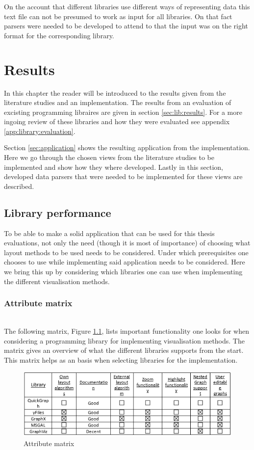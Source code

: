 \documentclass[a4paper,11pt]{kth-mag}
\begin{document}
On the account that different libraries use different ways of representing data this text file can not be presumed to work as input for all libraries. On that fact parsers were needed to be developed to
attend to that the input was on the right format for the corresponding library.
\chapter{Results}
\label{chap:results}
In this chapter the reader will be introduced to the results given from the literature studies and an implementation. The results from an evaluation of excisting programming
 libraires are given in section \ref{sec:lib:results}. For a more ingoing review of these libraries and how they were evaluated see appendix \ref{app:library:evaluation}.

Section \ref{sec:application} shows the resulting application from the implementation. Here we go through the chosen views from the literature studies to be implemented and show how they where developed. Lastly in this section,
developed data parsers that were needed to be implemented for these views are described.
\section{Library performance}
\label{sec:libperform}
To be able to make a solid application that can be used for this thesis evaluations, not only the need (though it is most of importance) of choosing what layout methods to be used needs to be considered. Under which prerequisites
one chooses to use while implementing said application needs to be considered. Here we bring this up by considering which libraries one can use when implementing the different visualisation methods.
\subsection{Attribute matrix}
\label{Lib:attribute}
\newline
\\
The following matrix, Figure \ref{fig:AttributeMatrix}, lists important functionality one looks for when considering a programming library for implementing visualisation methods. The matrix gives an overview of what the 
different libraries supports from the start. This matrix helps as an basis when selecting libraries for the implementation.\\

\begin{figure}[!htbp]
	\centering
	\includegraphics[scale=1.0]{LibraryAttributeMatrix}
	\caption{Attribute matrix}
	\label{fig:AttributeMatrix}
\end{figure}
\end{document}
